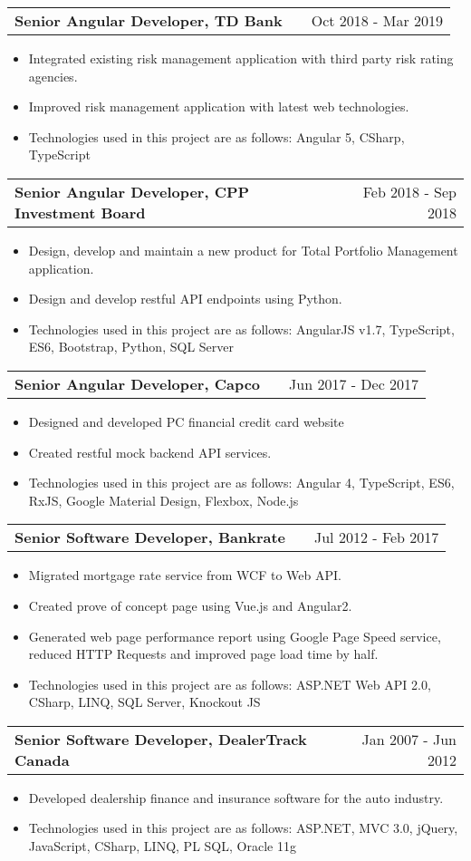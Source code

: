 \documentclass[a4paper,12pt]{article}
\makeatletter
\newenvironment{joblong}[2]
    {
    \begin{tabularx}{\linewidth}{@{}l X r@{}}
    \textbf{#1} & \hfill &  #2 \\[3.75pt]
    \end{tabularx}
    \begin{minipage}[t]{\linewidth}
    \begin{itemize}[nosep,after=\strut, leftmargin=1em, itemsep=3pt,label=--]
    }
    {
    \end{itemize}
    \end{minipage}    
    }
\makeatother
\begin{document}
\begin{joblong}{Senior Angular Developer, TD Bank}{Oct 2018 - Mar 2019}
\item Integrated existing risk management application with third party risk rating agencies.
\item Improved risk management application with latest web technologies.
\item Technologies used in this project are as follows:  Angular 5, CSharp, TypeScript
\end{joblong}

\begin{joblong}{Senior Angular Developer, CPP Investment Board}{Feb 2018 - Sep 2018}
\item Design, develop and maintain a new product for Total Portfolio Management application.
\item Design and develop restful API endpoints using Python. 
\item Technologies used in this project are as follows:  AngularJS v1.7, TypeScript, ES6, Bootstrap, Python, SQL Server
\end{joblong}

\begin{joblong}{Senior Angular Developer, Capco}{Jun 2017 - Dec 2017}
\item Designed and developed PC financial credit card website 
\item Created restful mock backend API services. 
\item Technologies used in this project are as follows:  Angular 4, TypeScript, ES6, RxJS, Google Material Design, Flexbox, Node.js
\end{joblong}

\begin{joblong}{Senior Software Developer, Bankrate}{Jul 2012 - Feb 2017}
\item Migrated mortgage rate service from WCF to Web API.
\item Created prove of concept page using Vue.js and Angular2. 
\item Generated web page performance report using Google Page Speed service, reduced HTTP Requests and improved page load time by half.
\item Technologies used in this project are as follows:  ASP.NET Web API 2.0, CSharp, LINQ, SQL Server, Knockout JS
\end{joblong}

\begin{joblong}{Senior Software Developer, DealerTrack Canada}{Jan 2007 - Jun 2012}
\item Developed dealership finance and insurance software for the auto industry.
\item Technologies used in this project are as follows:  ASP.NET, MVC 3.0, jQuery, JavaScript, CSharp, LINQ, PL SQL, Oracle 11g
\end{joblong}
\end{document}
